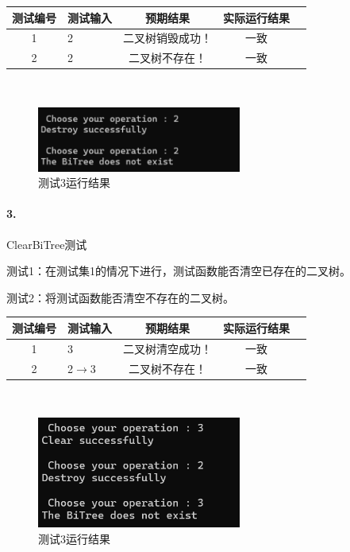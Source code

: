 \documentclass[supercite]{Experimental_Report}
\theoremstyle{definition}
\begin{document}
\begin{tabular}{|c|l|c|c|c|}
	\hline
	测试编号 & 测试输入 & 预期结果 & 实际运行结果 \\
	\hline
	1 & 2 & 二叉树销毁成功！ & 一致 \\
	\hline
	2 & 2 & 二叉树不存在！& 一致 \\
	\hline
\end{tabular}

~\

\begin{figure}[H]
 	\centering
 	\includegraphics[width=0.6\textwidth]{images/二叉树测试2.png}
 	\caption{测试3运行结果}
 	\label{txlab}
 \end{figure}

\paragraph{ 3.}ClearBiTree测试

测试1：在测试集1的情况下进行，测试函数能否清空已存在的二叉树。

测试2：将测试函数能否清空不存在的二叉树。

\vspace{0.5em}

\begin{tabular}{|c|l|c|c|c|}
	\hline
	测试编号 & 测试输入 & 预期结果 & 实际运行结果 \\
	\hline
	1 & 3 & 二叉树清空成功！ & 一致 \\
	\hline
	2 & 2$\rightarrow$3 & 二叉树不存在！ & 一致 \\
	\hline
\end{tabular}

~\

\begin{figure}[H]
 	\centering
 	\includegraphics[width=0.6\textwidth]{images/二叉树测试3.png}
 	\caption{测试3运行结果}
 	\label{txlab}
 \end{figure}
\end{document}
